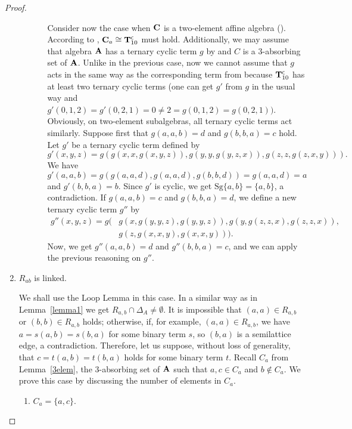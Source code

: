 \documentclass[11pt]{amsart}
\newcommand{\m}[1]{\mathbf{\uppercase{#1}}}
\newcommand{\co}{\scriptscriptstyle{\mathsf{C}}}
\theoremstyle{definition}
\theoremstyle{remark}
\theoremstyle{plain}
\begin{document}
\begin{proof}
\begin{enumerate}[wide, labelwidth=!,itemindent=!,labelindent=0pt]
\begin{enumerate}[wide, labelindent=0pt]
\begin{enumerate}[wide, labelwidth=!,labelindent=0pt,itemindent=!]
Consider now the case when ${\m C}$ is a two-element affine algebra (). According to , ${\m C}_a\cong {\m T}_{10}^{\co}$ must hold. Additionally, we may assume that algebra ${\m A}$ has a ternary cyclic term $g$ by  and $C$ is a $3$-absorbing set of ${\m A}$. Unlike in the previous case, now we cannot assume that $g$ acts in the same way as the corresponding term from  because ${\m T}_{10}^{\co}$ has at least two ternary cyclic terms (one can get $g'$ from $g$ in the usual way and $g'(0,1,2)=g'(0,2,1)=0\neq 2=g(0,1,2)=g(0,2,1))$. Obviously, on two-element subalgebras, all ternary cyclic terms act similarly. Suppose first that $g(a,a,b)=d$ and $g(b,b,a)=c$ hold. Let $g'$ be a ternary cyclic term defined by
$$g'(x,y,z) = g(g(x,x,g(x,y,z)),g(y,y,g(y,z,x)),g(z,z,g(z,x,y))).$$ We have $$g'(a,a,b)=g(g(a,a,d),g(a,a,d),g(b,b,d))=g(a,a,d)=a$$ and $g'(b,b,a)=b$. Since $g'$ is cyclic, we get $\mathrm{Sg}\{a,b\}=\{a,b\}$, a contradiction. If $g(a,a,b)=c$ and $g(b,b,a)=d$, we define a new ternary cyclic term $g''$ by
\begin{align*}
g''(x,y,z) = g(&g(x,g(y,y,z),g(y,y,z)),g(y,g(z,z,x),g(z,z,x)),\\ 
& g(z,g(x,x,y),g(x,x,y))).
\end{align*}
Now, we get $g''(a,a,b)=d$ and $g''(b,b,a)=c$, and we can apply the previous reasoning on $g''$.
\end{enumerate}

    
\end{enumerate}


\item[{\sc{\textbf{Case 2.}}}] $R_{ab}$ is linked.

We shall use the Loop Lemma in this case. In a similar way as in Lemma~\ref{lemma1} we get $R_{a,b}\cap \Delta_A\neq \emptyset$. It is impossible that $(a,a)\in R_{a,b}$ or $(b,b)\in R_{a,b}$ holds; otherwise, if, for example, $(a,a)\in R_{a,b}$, we have $a=s(a,b)=s(b,a)$ for some binary term $s$, so $(b,a)$ is a semilattice edge, a contradiction. Therefore, let us suppose, without loss of generality, that $c=t(a,b)=t(b,a)$ holds for some binary term $t$. Recall $C_a$ from Lemma~\ref{3elem}, the $3$-absorbing set of ${\m A}$ such that $a, c\in C_a$ and $b\notin C_a$. We prove this case by discussing the number of elements in $C_a$.

\begin{enumerate}[wide, labelwidth=!,labelindent=0pt,itemindent=!]
    \item[{\sc{\textbf{Subcase 2a.}}}] $C_a=\{a,c\}.$


\end{enumerate}
\end{enumerate}
\end{proof}
\end{document}
